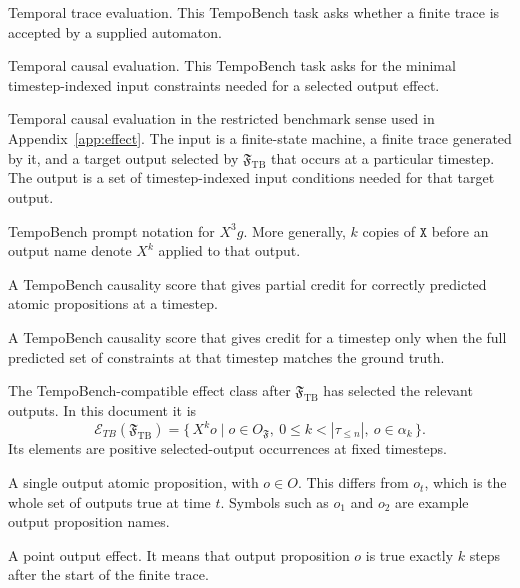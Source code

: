 \documentclass[11pt]{article}
\theoremstyle{remark}
\newcommand{\Frame}{\mathfrak{F}}
\begin{document}
\begin{description}[leftmargin=2.8cm,style=nextline]
  \item[TTE]
  Temporal trace evaluation. This TempoBench task asks whether a finite trace is
  accepted by a supplied automaton.

  \item[TCE]
  Temporal causal evaluation. This TempoBench task asks for the minimal
  timestep-indexed input constraints needed for a selected output effect.

  \item[TempoBench-style TCE]
  Temporal causal evaluation in the restricted benchmark sense used in
  Appendix~\ref{app:effect}. The input is a finite-state machine, a finite trace generated by
  it, and a target output selected by \(\Frame_{\mathrm{TB}}\) that occurs at a particular
  timestep. The output is a set of timestep-indexed input conditions needed for
  that target output.

  \item[\(\texttt{XXX }g\)]
  TempoBench prompt notation for \(X^3 g\). More generally, \(k\) copies of
  \(\texttt{X}\) before an output name denote \(X^k\) applied to that output.

  \item[AP-level score]
  A TempoBench causality score that gives partial credit for correctly predicted
  atomic propositions at a timestep.

  \item[TS-level score]
  A TempoBench causality score that gives credit for a timestep only when the
  full predicted set of constraints at that timestep matches the ground truth.

  \item[\(\mathcal{E}_{TB}(\Frame_{\mathrm{TB}})\)]
  The TempoBench-compatible effect class after \(\Frame_{\mathrm{TB}}\) has
  selected the relevant outputs. In this document it is
  \[
    \mathcal{E}_{TB}(\Frame_{\mathrm{TB}})
    =
    \{\,X^k o \mid
    o\in O_{\Frame},\ 0\leq k<|\tau_{\le n}|,\ 
    o\in\alpha_k\,\}.
  \]
  Its elements are positive selected-output occurrences at fixed timesteps.

  \item[\(o\)]
  A single output atomic proposition, with \(o\in O\). This differs from
  \(o_t\), which is the whole set of outputs true at time \(t\). Symbols such
  as \(o_1\) and \(o_2\) are example output proposition names.

  \item[\(X^k o\)]
  A point output effect. It means that output proposition \(o\) is true exactly
  \(k\) steps after the start of the finite trace.


\end{description}
\end{document}
